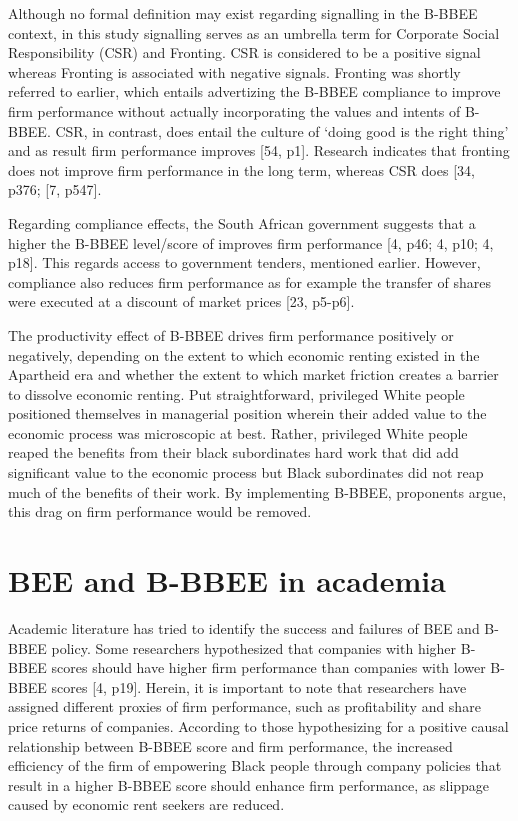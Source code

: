 Although no formal definition may exist regarding signalling in the B-BBEE context, in this study signalling serves as an umbrella term for Corporate Social Responsibility (CSR) and Fronting. CSR is considered to be a positive signal whereas Fronting is associated with negative signals. Fronting was shortly referred to earlier, which entails advertizing the B-BBEE compliance to improve firm performance without actually incorporating the values and intents of B-BBEE. CSR, in contrast, does entail the culture of ‘doing good is the right thing’ and as result firm performance improves  [54, p1]. Research indicates that fronting does not improve firm performance in the long term, whereas CSR does  [34, p376; [7, p547].

Regarding compliance effects, the South African government suggests that a higher the B-BBEE level/score of improves firm performance [4, p46; 4, p10; 4, p18]. This regards access to government tenders, mentioned earlier. However, compliance also reduces firm performance as for example the transfer of shares were executed at a discount of market prices  [23, p5-p6].

The productivity effect of B-BBEE drives firm performance positively or negatively, depending on the extent to which economic renting existed in the Apartheid era and whether the extent to which market friction creates a barrier to dissolve economic renting. Put straightforward, privileged White people positioned themselves in managerial position wherein their added value to the economic process was microscopic at best. Rather, privileged White people reaped the benefits from their black subordinates hard work that did add significant value to the economic process but Black subordinates did not reap much of the benefits of their work. By implementing B-BBEE, proponents argue, this drag on firm performance would be removed.
\section{BEE and B-BBEE in academia}
Academic literature has tried to identify the success and failures of BEE and B-BBEE policy. Some researchers hypothesized that companies with higher B-BBEE scores should have higher firm performance than companies with lower B-BBEE scores [4, p19]. Herein, it is important to note that researchers have assigned different proxies of firm performance, such as profitability and share price returns of companies. According to those hypothesizing for a positive causal relationship between B-BBEE score and firm performance, the increased efficiency of the firm of empowering Black people through company policies that result in a higher B-BBEE score should enhance firm performance, as slippage caused by economic rent seekers are reduced. 

